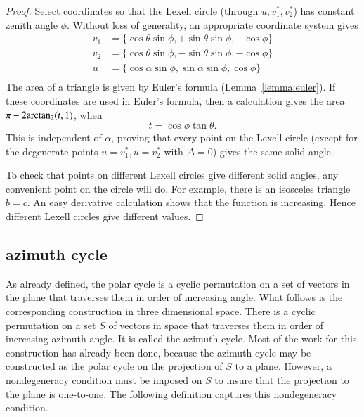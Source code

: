 \begin{proof}  Select coordinates so that the Lexell circle (through $u,v^*_1,v^*_2$) has constant zenith angle $\phi$.  Without loss of generality,  an appropriate coordinate system gives 
$$
\begin{array}{lll}
v_1 &= \{\cos\theta\sin\phi,+\sin\theta\sin\phi,-\cos\phi\}\\
v_2 &= \{\cos\theta\sin\phi,-\sin\theta\sin\phi,-\cos\phi\}\\
u &= \{\cos\alpha\sin\phi,\sin\alpha\sin\phi,\cos\phi\}\\
\end{array}
$$
The area of a triangle is given by Euler's formula (Lemma~\ref{lemma:euler}).  If these coordinates are used in Euler's formula,
then a calculation gives the area $\pi-2{\operatorname{arctan_2}}(t,1)$, when
$$
t=\cos\phi \tan\theta.
$$
This is independent of $\alpha$, proving that every point on the Lexell circle (except for the degenerate points $u= v^*_1,u=v^*_2$ with $\Delta=0$) gives the same solid angle.

To check that points on different Lexell circles give different solid angles,  any convenient point on the circle will do.  For example, there is an isosceles triangle $b=c$.  An easy derivative calculation shows that the function is increasing.  Hence different Lexell circles give different values.
\end{proof}


\subsection{azimuth cycle}

As already defined, the polar cycle is a cyclic permutation on a set
of vectors in the plane that traverses them in order of increasing
angle.  What follows is the corresponding construction in three dimensional
space.  There is  a cyclic permutation on a set $S$ of vectors in space
that traverses them in order of increasing azimuth angle.  It is called 
the azimuth cycle.  Most of the work for this construction has already been done, because the azimuth cycle may be constructed as the polar cycle on the projection of $S$ to a plane.  However, 
a nondegeneracy condition must be imposed on $S$ to insure that
the projection to the plane is one-to-one.  The following
definition captures this nondegeneracy condition.


